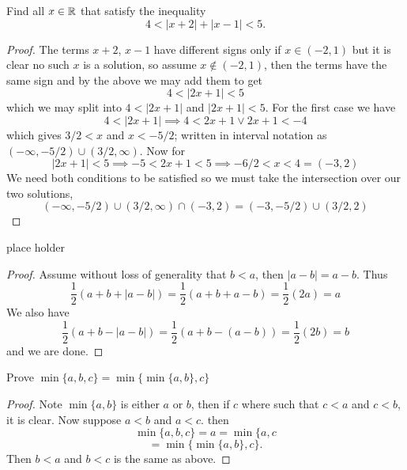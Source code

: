 \question 
Find all $x \in \mathbb{R}$ that satisfy the inequality 
\[ 4 < |x + 2| + |x - 1| < 5. \] 


\begin{proof}
    The terms $x + 2$, $x - 1$ have different signs only if $x \in (-2, 1)$ but it is clear 
    no such $x$ is a solution, so assume $x \notin (-2, 1)$, then the terms have the same sign and by the above we may add them 
    to get 
    \[4 < |2x +1 | < 5\]
    which we may split into $4 < |2x + 1| $ and $|2x + 1| < 5$. 
    For the first case we have 
    \[4 < |2x + 1| \implies 4 < 2x + 1 \vee 2x + 1 < -4\]
    which gives $3/2 < x$ and $x < -5/2$; written in interval notation as $(-\infty, -5/2) \cup (3/2, \infty)$. 
    Now for 
    \[|2x + 1| < 5 \implies -5 < 2x + 1 < 5 \implies -6/2 < x < 4 = (-3, 2)\]
    We need both conditions to be satisfied so we must take the intersection over our two solutions, 
    \[(-\infty, -5/2) \cup (3/2, \infty) \cap (-3, 2) = (-3, -5/2) \cup (3/2, 2)\]
\end{proof}

\question 
place holder 


\begin{alphaparts}
\questionpart

\begin{proof}
    Assume without loss of generality that $b < a$, then $|a - b| = a - b$. 
    Thus 
    \[\frac{1}{2}(a + b + |a - b|) = \frac{1}{2}(a + b + a -b ) = \frac{1}{2}(2a) = a\]
    We also have 
    \[\frac{1}{2}(a + b - |a - b|) = \frac{1}{2}(a + b -(a - b)) = \frac{1}{2}(2b) = b\]
    and we are done.  
\end{proof}

\questionpart 
Prove $\min\{a, b, c\} = \min\{\min\{a, b\}, c\}$

\begin{proof}
    Note $\min\{a, b\}$ is either $a$ or $b$, then if $c$ where such that $c < a$ and $c < b$, it is clear. Now suppose $a < b$ and $a < c$. then 
\[ \min\{a, b, c\} = a = \min\{a, c \] 
\[ = \min\{\min\{a, b\}, c\}.\]
Then $b < a$ and $b < c$ is the same as above.

\end{proof}


\end{alphaparts}


\question 

